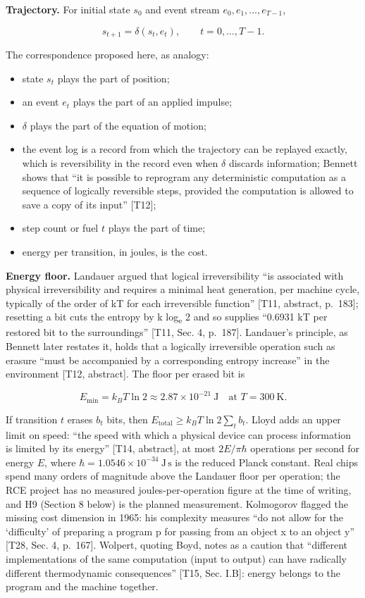 \documentclass[10pt,letterpaper]{article}
\providecommand{\tightlist}{\setlength{\itemsep}{1pt}\setlength{\parskip}{0pt}}
\begin{document}
\textbf{Trajectory.} For initial state \(s_0\) and event stream
\(e_0,e_1,\dots,e_{T-1}\),

\[
s_{t+1}=\delta(s_t,e_t),\qquad t=0,\dots,T-1.
\]

The correspondence proposed here, as analogy:

\begin{itemize}
\tightlist
\item
  state \(s_t\) plays the part of position;
\item
  an event \(e_t\) plays the part of an applied impulse;
\item
  \(\delta\) plays the part of the equation of motion;
\item
  the event log is a record from which the trajectory can be replayed
  exactly, which is reversibility in the record even when \(\delta\)
  discards information; Bennett shows that ``it is possible to reprogram
  any deterministic computation as a sequence of logically reversible
  steps, provided the computation is allowed to save a copy of its
  input'' {[}T12{]};
\item
  step count or fuel \(t\) plays the part of time;
\item
  energy per transition, in joules, is the cost.
\end{itemize}

\textbf{Energy floor.} Landauer argued that logical irreversibility ``is
associated with physical irreversibility and requires a minimal heat
generation, per machine cycle, typically of the order of kT for each
irreversible function'' {[}T11, abstract, p.~183{]}; resetting a bit
cuts the entropy by k log\textsubscript{e} 2 and so supplies ``0.6931 kT
per restored bit to the surroundings'' {[}T11, Sec. 4, p.~187{]}.
Landauer's principle, as Bennett later restates it, holds that a
logically irreversible operation such as erasure ``must be accompanied
by a corresponding entropy increase'' in the environment {[}T12,
abstract{]}. The floor per erased bit is

\[
E_{\min}=k_B T\ln 2\approx 2.87\times10^{-21}\ \mathrm{J}\quad\text{at } T=300\ \mathrm{K}.
\]

If transition \(t\) erases \(b_t\) bits, then
\(E_{\text{total}}\ge k_B T\ln 2\sum_t b_t\). Lloyd adds an upper limit
on speed: ``the speed with which a physical device can process
information is limited by its energy'' {[}T14, abstract{]}, at most
\(2E/\pi\hbar\) operations per second for energy \(E\), where
\(\hbar=1.0546\times10^{-34}\ \mathrm{J\,s}\) is the reduced Planck
constant. Real chips spend many orders of magnitude above the Landauer
floor per operation; the RCE project has no measured
joules-per-operation figure at the time of writing, and H9 (Section 8
below) is the planned measurement. Kolmogorov flagged the missing cost
dimension in 1965: his complexity measures ``do not allow for the
`difficulty' of preparing a program p for passing from an object x to an
object y'' {[}T28, Sec. 4, p.~167{]}. Wolpert, quoting Boyd, notes as a
caution that ``different implementations of the same computation (input
to output) can have radically different thermodynamic consequences''
{[}T15, Sec. I.B{]}: energy belongs to the program and the machine
together.
\end{document}
